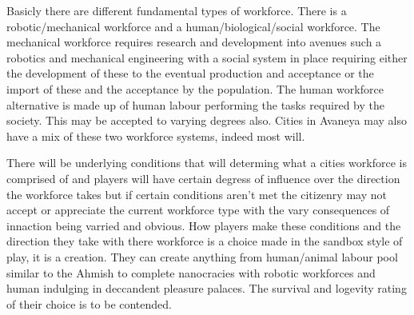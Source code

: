 Basicly there are different fundamental types of workforce. There is a robotic/mechanical workforce and a human/biological/social workforce. The mechanical workforce requires research and development into avenues such a robotics and mechanical engineering with a social system in place requiring either the development of these to the eventual production and acceptance or the import of these and the acceptance by the population. The human workforce alternative is made up of human labour performing the tasks required by the society. This may be accepted to varying degrees also. Cities in Avaneya may also have a mix of these two workforce systems, indeed most will. 

There will be underlying conditions that will determing what a cities workforce is comprised of and players will have certain degress of influence over the direction the workforce takes but if certain conditions aren't met the citizenry may not accept or appreciate the current workforce type with the vary consequences of innaction being varried and obvious. How players make these conditions and the direction they take with there workforce is a choice made in the sandbox style of play, it is a creation. They can create anything from human/animal labour pool similar to the Ahmish to complete nanocracies with robotic workforces and human indulging in deccandent pleasure palaces. The survival and logevity rating of their choice is to be contended.




